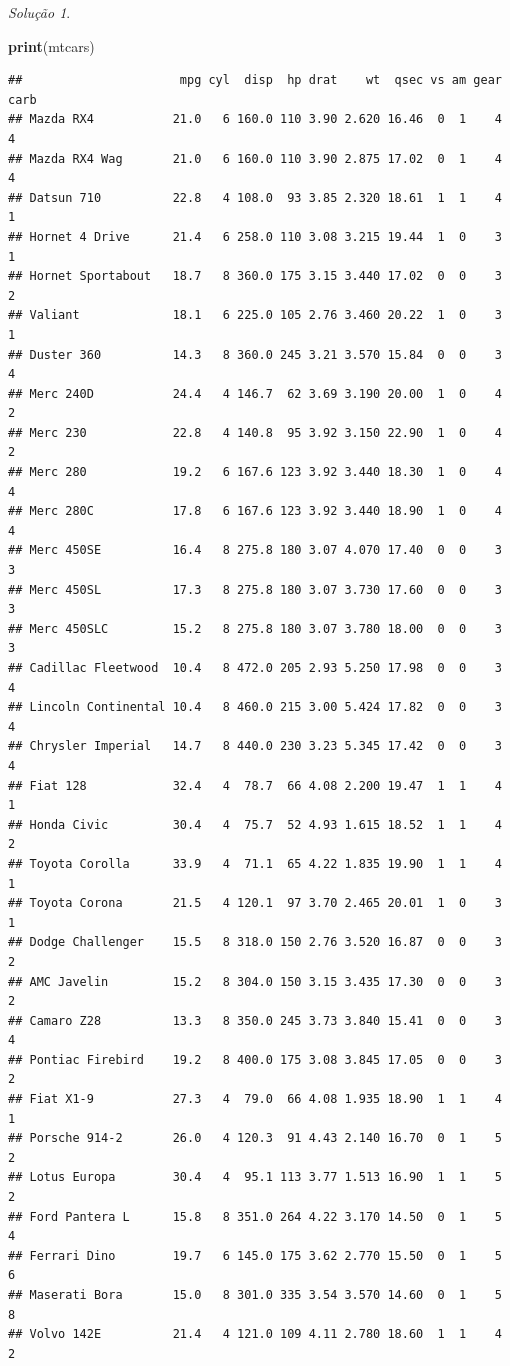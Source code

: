 \documentclass[
]{latex/krantz}
\newenvironment{Shaded}{\begin{snugshade}}{\end{snugshade}}
\newcommand{\FunctionTok}[1]{\textcolor[rgb]{0.13,0.29,0.53}{\textbf{#1}}}
\newcommand{\NormalTok}[1]{#1}
\theoremstyle{definition}
\theoremstyle{definition}
\theoremstyle{definition}
\theoremstyle{definition}
\theoremstyle{remark}
\newtheorem*{solution}{Solução}
\begin{document}
\begin{solution}
\leavevmode

\begin{Shaded}
\begin{Highlighting}[]
\FunctionTok{print}\NormalTok{(mtcars)}
\end{Highlighting}
\end{Shaded}

\begin{verbatim}
##                      mpg cyl  disp  hp drat    wt  qsec vs am gear carb
## Mazda RX4           21.0   6 160.0 110 3.90 2.620 16.46  0  1    4    4
## Mazda RX4 Wag       21.0   6 160.0 110 3.90 2.875 17.02  0  1    4    4
## Datsun 710          22.8   4 108.0  93 3.85 2.320 18.61  1  1    4    1
## Hornet 4 Drive      21.4   6 258.0 110 3.08 3.215 19.44  1  0    3    1
## Hornet Sportabout   18.7   8 360.0 175 3.15 3.440 17.02  0  0    3    2
## Valiant             18.1   6 225.0 105 2.76 3.460 20.22  1  0    3    1
## Duster 360          14.3   8 360.0 245 3.21 3.570 15.84  0  0    3    4
## Merc 240D           24.4   4 146.7  62 3.69 3.190 20.00  1  0    4    2
## Merc 230            22.8   4 140.8  95 3.92 3.150 22.90  1  0    4    2
## Merc 280            19.2   6 167.6 123 3.92 3.440 18.30  1  0    4    4
## Merc 280C           17.8   6 167.6 123 3.92 3.440 18.90  1  0    4    4
## Merc 450SE          16.4   8 275.8 180 3.07 4.070 17.40  0  0    3    3
## Merc 450SL          17.3   8 275.8 180 3.07 3.730 17.60  0  0    3    3
## Merc 450SLC         15.2   8 275.8 180 3.07 3.780 18.00  0  0    3    3
## Cadillac Fleetwood  10.4   8 472.0 205 2.93 5.250 17.98  0  0    3    4
## Lincoln Continental 10.4   8 460.0 215 3.00 5.424 17.82  0  0    3    4
## Chrysler Imperial   14.7   8 440.0 230 3.23 5.345 17.42  0  0    3    4
## Fiat 128            32.4   4  78.7  66 4.08 2.200 19.47  1  1    4    1
## Honda Civic         30.4   4  75.7  52 4.93 1.615 18.52  1  1    4    2
## Toyota Corolla      33.9   4  71.1  65 4.22 1.835 19.90  1  1    4    1
## Toyota Corona       21.5   4 120.1  97 3.70 2.465 20.01  1  0    3    1
## Dodge Challenger    15.5   8 318.0 150 2.76 3.520 16.87  0  0    3    2
## AMC Javelin         15.2   8 304.0 150 3.15 3.435 17.30  0  0    3    2
## Camaro Z28          13.3   8 350.0 245 3.73 3.840 15.41  0  0    3    4
## Pontiac Firebird    19.2   8 400.0 175 3.08 3.845 17.05  0  0    3    2
## Fiat X1-9           27.3   4  79.0  66 4.08 1.935 18.90  1  1    4    1
## Porsche 914-2       26.0   4 120.3  91 4.43 2.140 16.70  0  1    5    2
## Lotus Europa        30.4   4  95.1 113 3.77 1.513 16.90  1  1    5    2
## Ford Pantera L      15.8   8 351.0 264 4.22 3.170 14.50  0  1    5    4
## Ferrari Dino        19.7   6 145.0 175 3.62 2.770 15.50  0  1    5    6
## Maserati Bora       15.0   8 301.0 335 3.54 3.570 14.60  0  1    5    8
## Volvo 142E          21.4   4 121.0 109 4.11 2.780 18.60  1  1    4    2
\end{verbatim}


\end{solution}
\end{document}
